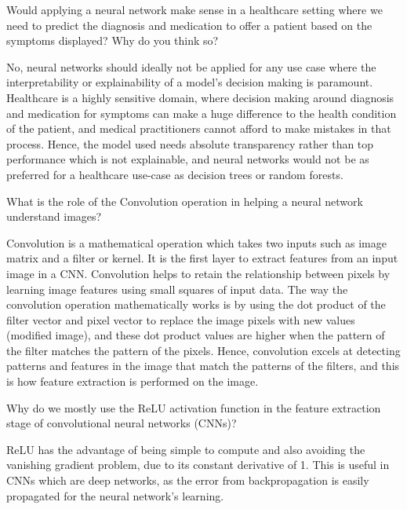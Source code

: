 	\begin{qanda}
		\begin{question}
Would applying a neural network make sense in a healthcare setting where we need to predict the diagnosis and medication to offer a patient based on the symptoms displayed? Why do you think so?
		\end{question}
		\begin{answer}
No, neural networks should ideally not be applied for any use case where the interpretability or explainability of a model's decision making is paramount. Healthcare is a highly sensitive domain, where decision making around diagnosis and medication for symptoms can make a huge difference to the health condition of the patient, and medical practitioners cannot afford to make mistakes in that process. Hence, the model used needs absolute transparency rather than top performance which is not explainable, and neural networks would not be as preferred for a healthcare use-case as decision trees or random forests.
		\end{answer}
	\end{qanda}

	\begin{qanda}
		\begin{question}
What is the role of the Convolution operation in helping a neural network understand images?
		\end{question}
		\begin{answer}
Convolution is a mathematical operation which takes two inputs such as image matrix and a filter or kernel. It is the first layer to extract features from an input image in a CNN. Convolution helps to retain the relationship between pixels by learning image features using small squares of input data. The way the convolution operation mathematically works is by using the dot product of the filter vector and pixel vector to replace the image pixels with new values (modified image), and these dot product values are higher when the pattern of the filter matches the pattern of the pixels. Hence, convolution excels at detecting patterns and features in the image that match the patterns of the filters, and this is how feature extraction is performed on the image.
		\end{answer}
	\end{qanda}

	\begin{qanda}
		\begin{question}
Why do we mostly use the ReLU activation function in the feature extraction stage of convolutional neural networks (CNNs)?
		\end{question}
		\begin{answer}
ReLU has the advantage of being simple to compute and also avoiding the vanishing gradient problem, due to its constant derivative of 1. This is useful in CNNs which are deep networks, as the error from backpropagation is easily propagated for the neural network's learning.
		\end{answer}
	\end{qanda}


